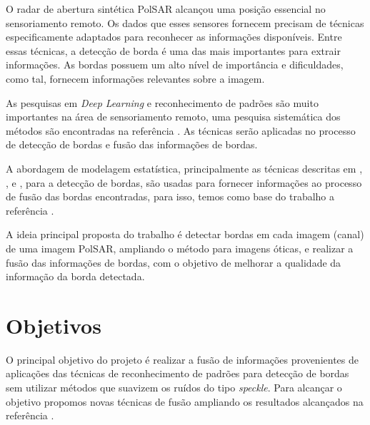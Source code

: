 \documentclass[runningheads]{llncs}
\begin{document}
O radar de abertura sintética PolSAR alcançou uma posição essencial no sensoriamento remoto. Os dados que esses sensores fornecem precisam de técnicas especificamente adaptados para reconhecer as informações disponíveis. Entre essas técnicas, a detecção de borda é uma das mais importantes para extrair informações. As bordas possuem um alto nível de importância e dificuldades, como tal, fornecem informações relevantes sobre a imagem.

As pesquisas em \textit{Deep Learning} e reconhecimento de padrões são muito importantes na área de sensoriamento remoto, uma pesquisa sistemática dos métodos são encontradas na referência \cite{ztmxzxf}. 
As técnicas serão aplicadas no processo de detecção de bordas e fusão das informações de bordas. 

A abordagem de modelagem estatística, principalmente as técnicas descritas em \cite{bmf_2020}, \cite{nhfc},  e \cite{ref_proc3}, para a detecção de bordas, são usadas para fornecer informações ao processo de fusão das bordas encontradas, para isso, temos como base do trabalho a referência \cite{ref_proc4}. 

A ideia principal proposta do trabalho é detectar bordas em cada imagem (canal) de uma imagem PolSAR, ampliando o método para imagens óticas, e realizar a fusão das informações de bordas, com o objetivo de melhorar a qualidade da informação da borda detectada.

\section{Objetivos}

O principal objetivo do projeto é realizar a fusão de informações provenientes de aplicações das técnicas de reconhecimento de padrões para detecção de bordas sem utilizar métodos que suavizem os ruídos do tipo \textit{speckle}. Para alcançar o objetivo propomos novas técnicas de fusão ampliando os resultados alcançados na referência \cite{bmf_2020}.
\end{document}

